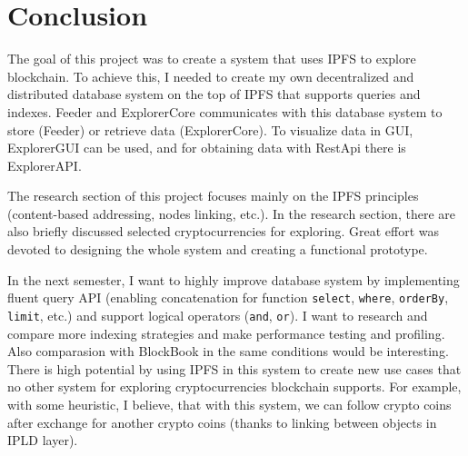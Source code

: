 \chapter{Conclusion}
\label{Conclusion}

The goal of this project was to create a system that uses IPFS to explore blockchain. To achieve this, I needed to create my own decentralized and distributed database system on the top of IPFS that supports queries and indexes. Feeder and ExplorerCore communicates with this database system to store (Feeder) or retrieve data (ExplorerCore). To visualize data in GUI, ExplorerGUI can be used, and for obtaining data with RestApi there is ExplorerAPI.

The research section of this project focuses mainly on the IPFS principles (content-based addressing, nodes linking, etc.). In the research section, there are also briefly discussed selected cryptocurrencies for exploring. Great effort was devoted to designing the whole system and creating a functional prototype.

In the next semester, I want to highly improve database system by implementing fluent query API (enabling concatenation for function \texttt{select}, \texttt{where}, \texttt{orderBy}, \texttt{limit}, etc.) and support logical operators (\texttt{and}, \texttt{or}). I want to research and compare more indexing strategies and make performance testing and profiling. Also comparasion with BlockBook in the same conditions would be interesting. There is high potential by using IPFS in this system to create new use cases that no other system for exploring cryptocurrencies blockchain supports. For example, with some heuristic, I believe, that with this system, we can follow crypto coins after exchange for another crypto coins (thanks to linking between objects in IPLD layer).

